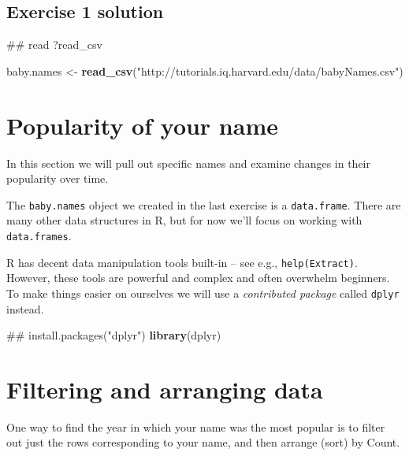 \documentclass[]{book}
\newenvironment{Shaded}{\begin{snugshade}}{\end{snugshade}}
\newcommand{\KeywordTok}[1]{\textcolor[rgb]{0.13,0.29,0.53}{\textbf{#1}}}
\newcommand{\StringTok}[1]{\textcolor[rgb]{0.31,0.60,0.02}{#1}}
\newcommand{\NormalTok}[1]{#1}
\begin{document}
\subsection{Exercise 1 solution}\label{exercise-1-solution}

\begin{Shaded}
\begin{Highlighting}[]
\NormalTok{## read ?read_csv}
\end{Highlighting}
\end{Shaded}

\begin{Shaded}
\begin{Highlighting}[]
\NormalTok{baby.names <-}\StringTok{ }\KeywordTok{read_csv}\NormalTok{(}\StringTok{"http://tutorials.iq.harvard.edu/data/babyNames.csv"}\NormalTok{)}
\end{Highlighting}
\end{Shaded}

\section{Popularity of your name}\label{popularity-of-your-name}

In this section we will pull out specific names and examine changes in
their popularity over time.

The \texttt{baby.names} object we created in the last exercise is a
\texttt{data.frame}. There are many other data structures in R, but for
now we'll focus on working with \texttt{data.frames}.

R has decent data manipulation tools built-in -- see e.g.,
\texttt{help(Extract)}. However, these tools are powerful and complex
and often overwhelm beginners. To make things easier on ourselves we
will use a \emph{contributed package} called \texttt{dplyr} instead.

\begin{Shaded}
\begin{Highlighting}[]
\NormalTok{## install.packages("dplyr")}
\KeywordTok{library}\NormalTok{(dplyr)}
\end{Highlighting}
\end{Shaded}

\section{Filtering and arranging
data}\label{filtering-and-arranging-data}

One way to find the year in which your name was the most popular is to
filter out just the rows corresponding to your name, and then arrange
(sort) by Count.
\end{document}
